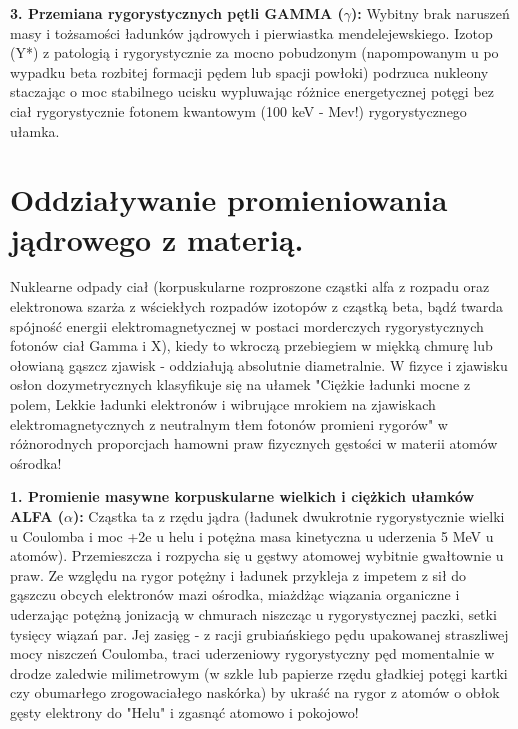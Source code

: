 \documentclass[11pt, a4paper]{article}
\begin{document}
\textbf{3. Przemiana rygorystycznych pętli GAMMA ($\gamma$):}
Wybitny brak naruszeń masy i tożsamości ładunków jądrowych i pierwiastka mendelejewskiego. Izotop (Y*) z patologią i rygorystycznie za mocno pobudzonym (napompowanym u po wypadku beta rozbitej formacji pędem lub spacji powłoki) podrzuca nukleony staczając o moc stabilnego ucisku wypluwając różnice energetycznej potęgi bez ciał rygorystycznie fotonem kwantowym (100 keV - Mev!) rygorystycznego ułamka.

\section{Oddziaływanie promieniowania jądrowego z materią.}

Nuklearne odpady ciał (korpuskularne rozproszone cząstki alfa z rozpadu oraz elektronowa szarża z wściekłych rozpadów izotopów z cząstką beta, bądź twarda spójność energii elektromagnetycznej w postaci morderczych rygorystycznych fotonów ciał Gamma i X), kiedy to wkroczą przebiegiem w miękką chmurę lub ołowianą gąszcz zjawisk - oddziałują absolutnie diametralnie. W fizyce i zjawisku osłon dozymetrycznych klasyfikuje się na ułamek "Ciężkie ładunki mocne z polem, Lekkie ładunki elektronów i wibrujące mrokiem na zjawiskach elektromagnetycznych z neutralnym tłem fotonów promieni rygorów" w różnorodnych proporcjach hamowni praw fizycznych gęstości w materii atomów ośrodka!

\textbf{1. Promienie masywne korpuskularne wielkich i ciężkich ułamków ALFA ($\alpha$):}
Cząstka ta z rzędu jądra (ładunek dwukrotnie rygorystycznie wielki u Coulomba i moc +2e u helu i potężna masa kinetyczna u uderzenia 5 MeV u atomów). Przemieszcza i rozpycha się u gęstwy atomowej wybitnie gwałtownie u praw. Ze względu na rygor potężny i ładunek przykleja z impetem z sił do gąszczu obcych elektronów mazi ośrodka, miażdżąc wiązania organiczne i uderzając potężną jonizacją w chmurach niszcząc u rygorystycznej paczki, setki tysięcy wiązań par. Jej zasięg - z racji grubiańskiego pędu upakowanej straszliwej mocy niszczeń Coulomba, traci uderzeniowy rygorystyczny pęd momentalnie w drodze zaledwie milimetrowym (w szkle lub papierze rzędu gładkiej potęgi kartki czy obumarłego zrogowaciałego naskórka) by ukraść na rygor z atomów o obłok gęsty elektrony do "Helu" i zgasnąć atomowo i pokojowo!
\end{document}
